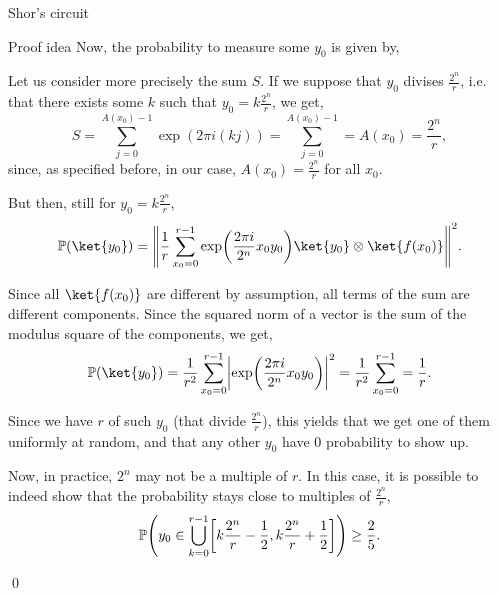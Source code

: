 \documentclass[a4paper]{article}
\begin{document}
\begin{parag}{Shor's circuit}
\begin{subparag}{Proof idea}
        Now, the probability to measure some $y_0$ is given by,

        Let us consider more precisely the sum $S$. If we suppose that $y_0$ divises $\frac{2^n}{r}$, i.e. that there exists some $k$ such that $y_0 = k\frac{2^n}{r}$, we get,
        \[S = \sum_{j=0}^{A\left(x_0\right) - 1} \exp\left(2 \pi i \left(kj\right)\right) = \sum_{j=0}^{A\left(x_0\right) - 1} = A\left(x_0\right) = \frac{2^n}{r},\]
        since, as specified before, in our case, $A\left(x_0\right) = \frac{2^n}{r}$ for all $x_0$.

        But then, still for $y_0 = k\frac{2^n}{r}$, 
        \[\prob\left(\ket{y_0}\right) = \left\|\frac{1}{r} \sum_{x_0 = 0}^{r-1} \exp\left(\frac{2\pi i}{2^n} x_0 y_0\right) \ket{y_0} \otimes \ket{f\left(x_0\right)}\right\|^2 .\]

        Since all $\ket{f\left(x_0\right)}$ are different by assumption, all terms of the sum are different components. Since the squared norm of a vector is the sum of the modulus square of the components, we get,
        \[\prob\left(\ket{y_0}\right) = \frac{1}{r^2} \sum_{x_0 = 0}^{r-1} \left|\exp\left(\frac{2\pi i}{2^n} x_0 y_0\right)\right|^2 = \frac{1}{r^2} \sum_{x_0 = 0}^{r-1} = \frac{1}{r}.\]

        Since we have $r$ of such $y_0$ (that divide $\frac{2^n}{r}$), this yields that we get one of them uniformly at random, and that any other $y_0$ have 0 probability to show up.

        Now, in practice, $2^n$ may not be a multiple of $r$. In this case, it is possible to indeed show that the probability stays close to multiples of $\frac{2^n}{r}$,
        \[\prob\left(y_0 \in \bigcup_{k=0}^{r-1} \left[k \frac{2^n}{r} - \frac{1}{2}, k\frac{2^n}{r} + \frac{1}{2}\right]\right) \geq \frac{2}{5}.\]
        
        \qed
    \end{subparag}
\end{parag}
\end{document}

